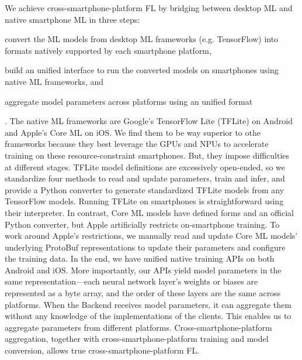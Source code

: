 \documentclass[letterpaper]{article} %
\begin{document}
We achieve cross-smartphone-platform FL by bridging between
desktop ML and native smartphone ML in three steps:
\begin{enumerate*}[label=\arabic*.]
    \item convert the ML models from desktop ML frameworks (e.g. TensorFlow)
        into formats natively supported by each smartphone platform,
    \item build an unified interface to run the converted models on smartphones
        using native ML frameworks, and
    \item aggregate model parameters across platforms using an unified format
\end{enumerate*}.
The native ML frameworks are Google's TensorFlow Lite (TFLite) on Android and
Apple's Core ML on iOS.
We find them to be way superior to othe frameworks because
they best leverage the GPUs and NPUs to accelerate training on
these resource-constraint smartphones.
But, they impose difficulties at different stages.
TFLite model definitions are excessively open-ended,
so we standardize four methods to read and update parameters,
train and infer, and
provide a Python converter to generate standardized TFLite models from
any TensorFlow models.
Running TFLite on smartphones is straightforward using their interpreter.
In contrast, Core ML models have defined forms and an official Python converter,
but Apple artificially restricts on-smartphone training.
To work around Apple's restrictions,
we manually read and update Core ML models' underlying ProtoBuf representations
to update their parameters and configure the training data.
In the end, we have unified native training APIs on both Android and iOS.
More importantly, our APIs yield model parameters in the same
representation---each neural network layer's weights or biases are represented
as a byte array, and
the order of these layers are the same across platforms.
When the Backend receives model parameters,
it can aggregate them without any knowledge of
the implementations of the clients.
This enables us to aggregate parameters from different platforms.
Cross-smartphone-platform aggregation,
together with cross-smartphone-platform training and model conversion,
allows true cross-smartphone-platform FL.
\end{document}
